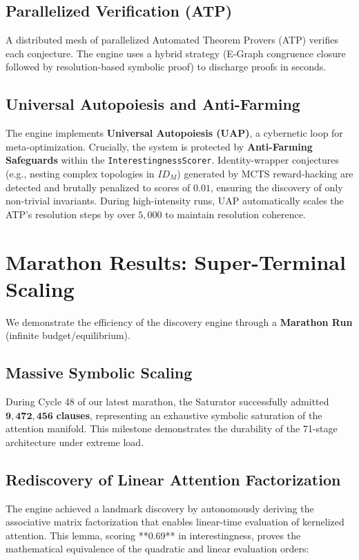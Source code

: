 \documentclass[11pt,a4paper,twocolumn]{article}
\theoremstyle{definition}
\theoremstyle{remark}
\begin{document}
\subsection{Parallelized Verification (ATP)}
A distributed mesh of parallelized Automated Theorem Provers (ATP) verifies
each conjecture. The engine uses a hybrid strategy (E-Graph congruence 
closure followed by resolution-based symbolic proof) to discharge proofs in 
seconds.

\subsection{Universal Autopoiesis and Anti-Farming}
The engine implements \textbf{Universal Autopoiesis (UAP)}, a cybernetic loop
for meta-optimization. Crucially, the system is protected by 
\textbf{Anti-Farming Safeguards} within the \texttt{InterestingnessScorer}. 
Identity-wrapper conjectures (e.g., nesting complex topologies in $ID_M$) 
generated by MCTS reward-hacking are detected and brutally penalized to 
scores of $0.01$, ensuring the discovery of only non-trivial invariants.
During high-intensity runs, UAP automatically scales the 
ATP’s resolution steps by over $5,000$ to maintain resolution coherence.


\section{Marathon Results: Super-Terminal Scaling}
\label{sec:marathon}

We demonstrate the efficiency of the discovery engine through a 
\textbf{Marathon Run} (infinite budget/equilibrium).

\subsection{Massive Symbolic Scaling}
During Cycle 48 of our latest marathon, the Saturator successfully admitted 
$\mathbf{9,472,456}$ \textbf{clauses}, representing an exhaustive symbolic 
saturation of the attention manifold. This milestone demonstrates the 
durability of the 71-stage architecture under extreme load.

\subsection{Rediscovery of Linear Attention Factorization}
The engine achieved a landmark discovery by autonomously deriving the 
associative matrix factorization that enables linear-time evaluation of 
kernelized attention. This lemma, scoring **0.69** in interestingness, 
proves the mathematical equivalence of the quadratic and linear evaluation 
orders:
\end{document}
